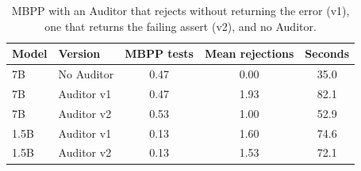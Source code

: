 \begin{table}[!tb]
\centering
\caption{MBPP with an Auditor that rejects without returning the error (v1), one that returns the failing assert (v2), and no Auditor.}
\label{tab:auditor}
\small
\begin{tabular}{llccc}
\toprule
Model & Version & MBPP tests & Mean rejections & Seconds \\
\midrule
7B & No Auditor & 0.47 & 0.00 & 35.0 \\
7B & Auditor v1 & 0.47 & 1.93 & 82.1 \\
7B & Auditor v2 & 0.53 & 1.00 & 52.9 \\
1.5B & Auditor v1 & 0.13 & 1.60 & 74.6 \\
1.5B & Auditor v2 & 0.13 & 1.53 & 72.1 \\
\bottomrule
\end{tabular}
\end{table}
